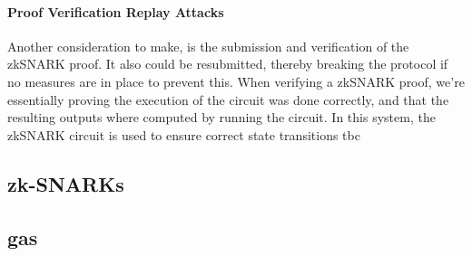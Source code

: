 \documentclass[../../thesis.tex]{subfiles}
\begin{document}
\paragraph{Proof Verification Replay Attacks}
Another consideration to make, is the submission and verification of the zkSNARK proof. It also could be resubmitted, thereby breaking the protocol if no measures are in place to prevent this. When verifying a zkSNARK proof, we're essentially proving the execution of the circuit was done correctly, and that the resulting outputs where computed by running the circuit. In this system, the zkSNARK circuit is used to ensure correct state transitions tbc


\subsection{zk-SNARKs}

\subsection{gas}


\end{document}
